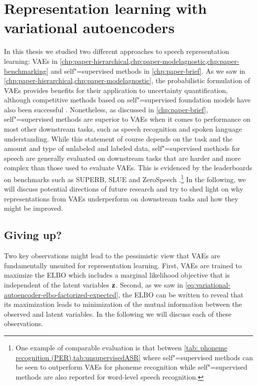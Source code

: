 \section{Representation learning with variational autoencoders}\label{sec_discussion:representation-learning-with-vaes}
%
In this thesis we studied two different approaches to speech representation learning: VAEs in \cref{chp:paper-hierarchical,chp:paper-modelagnostic,chp:paper-benchmarking} and self"=supervised methods in \cref{chp:paper-brief}. 
As we saw in \cref{chp:paper-hierarchical,chp:paper-modelagnostic}, the probabilistic formulation of VAEs provides benefits for their application to uncertainty quantification, although competitive methods based on self"=supervised foundation models have also been successful \parencite{xiao_we_2021,hendrycks_using_2019,bergman_classificationbased_2020}. 
Nonetheless, as discussed in \cref{chp:paper-brief}, self"=supervised methods are superior to VAEs when it comes to performance on most other downstream tasks, such as speech recognition and spoken language understanding. 
While this statement of course depends on the task and the amount and type of unlabeled and labeled data, self"=supervised methods for speech are generally evaluated on downstream tasks that are harder and more complex than those used to evaluate VAEs. This is evidenced by the leaderboards on benchmarks such as SUPERB, SLUE and ZeroSpeech \parencite{yang_superb_2021,shon_slue_2021,dunbar_zero_2021}.\footnote{One example of comparable evaluation is that between \cref{tab: phoneme recognition (PER),tab:unsupervisedASR} where self"=supervised methods can be seen to outperform VAEs for phoneme recognition while self"=supervised methods are also reported for word-level speech recognition.} 
In the following, we will discuss potential directions of future research and try to shed light on why representations from VAEs underperform on downstream tasks and how they might be improved.


\subsection{Giving up?}

Two key observations might lead to the pessimistic view that VAEs are fundamentally unsuited for representation learning. 
First, VAEs are trained to maximize the ELBO which includes a marginal likelihood objective that is independent of the latent variables ${\mathbf{z}}$. Second, as we saw in \cref{eq:variational-autoencoder-elbo-factorized-expected}, the ELBO can be written to reveal that its maximization leads to minimization of the mutual information between the observed and latent variables. In the following we will discuss each of these observations.

